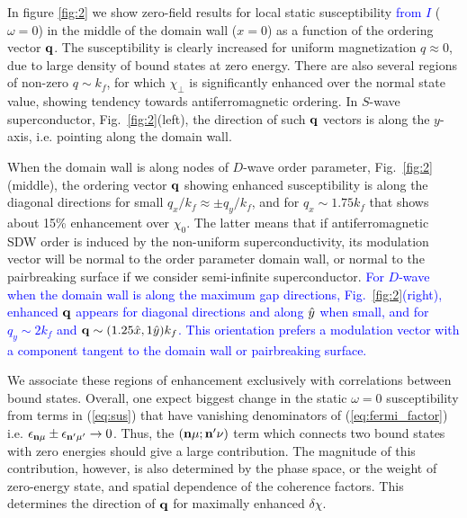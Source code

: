 \documentclass[prb,aps,showpacs,amsmath,twocolumn,10pt]{revtex4-1}
\newcommand{\blue}{\textcolor{blue}}
\begin{document}
In figure \ref{fig:2} we show zero-field results for local static
susceptibility \blue{from $I$} ($\omega=0$) in the middle of the domain wall ($x=0$) 
as a function of the ordering vector ${\bf q}$. 
The susceptibility is clearly increased for uniform magnetization $q\approx0$,
due to large density of bound states at zero energy. There are also several
regions of non-zero $q \sim k_f$, for which $\chi_\perp$ is significantly
enhanced over the normal state value, showing tendency towards
antiferromagnetic ordering.  In $S$-wave superconductor,
Fig.~\ref{fig:2}(left), the direction of such ${\bf q}$ vectors is along the
$y$-axis, i.e. pointing along the domain wall.
%

When the domain wall is along nodes of $D$-wave order parameter,
Fig.~\ref{fig:2}(middle), the ordering vector ${\bf q}$ showing enhanced
susceptibility is along the diagonal directions for small $q_x/k_f \approx \pm
q_y/k_f$, and for $q_x \sim 1.75 k_f$ that shows about 15\% enhancement over
$\chi_0$.  The latter means that if antiferromagnetic SDW order is induced by
the non-uniform superconductivity, its modulation vector will be normal to the
order parameter domain wall, or normal to the pairbreaking surface if we
consider semi-infinite superconductor. \blue{For $D$-wave
when the domain wall is along the maximum gap directions, Fig.~\ref{fig:2}(right), enhanced ${\bf q}$ appears for diagonal directions and along $\hat{y}$ when small, and for $q_y\sim 2k_f$ and ${\bf q}\sim(1.25\hat{x},1\hat{y})k_f$. This orientation prefers a modulation vector with a component tangent to the domain wall or pairbreaking surface.} 

We associate these regions of enhancement exclusively with correlations between bound states. 
Overall, one expect biggest change in the static $\omega=0$ susceptibility from terms in 
(\ref{eq:sus}) that have vanishing denominators of (\ref{eq:fermi_factor}) i.e.  
$\epsilon_{{\bf n}\mu}\pm\epsilon_{{\bf n}'\mu'} \to 0 $. 
Thus, the $({\bf n}\mu;{\bf n}'\nu)$ term
which connects two bound states with zero energies should give a large contribution. 
The magnitude of this contribution, however, is also determined by the phase space, 
or the weight of zero-energy state,
and spatial dependence of the coherence factors. 
This determines the direction of ${\bf q}$ for maximally enhanced $\delta \chi$.
\end{document}
